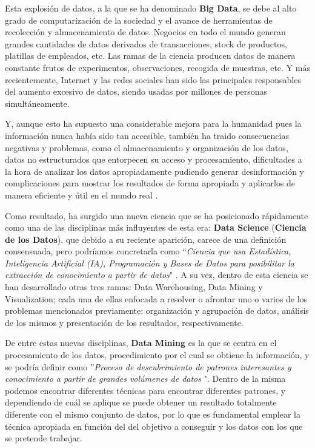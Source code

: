\documentclass[3p,twocolumn]{elsarticle}
\begin{document}
Esta explosión de datos, a la que se ha denominado \textbf{Big Data}, se debe al alto grado de computarización de la sociedad y el avance de herramientas de recolección y almacenamiento de datos. Negocios en todo el mundo generan grandes cantidades de datos derivados de transacciones, stock de productos,  platillas de empleados, etc. Las ramas de la ciencia producen datos de manera constante frutos de experimentos, observaciones, recogida de muestras, etc. Y más recientemente, Internet y las redes sociales han sido las principales responsables del aumento excesivo de datos, siendo usadas por millones de personas simultáneamente.

Y, aunque esto ha supuesto una considerable mejora para la humanidad pues la información nunca había sido tan accesible, también ha traido consecuencias negativas y problemas, como el almacenamiento y organización de los datos, datos no estructurados que entorpecen su acceso y procesamiento, dificultades a la hora de analizar los datos apropiadamente pudiendo generar desinformación y complicaciones para mostrar los resultados de forma apropiada y aplicarlos de manera eficiente y útil en el mundo real \cite{cita3}.

Como resultado, ha surgido una nueva ciencia que se ha posicionado rápidamente como una de las disciplinas más influyentes de esta era: \textbf{Data Science} (\textbf{Ciencia de los Datos}), que debido a su reciente aparición, carece de una definición consensuada, pero podríamos concretarla como ``\textit{Ciencia que usa Estadística, Inteligencia Artificial (IA), Programación y Bases de Datos para posibilitar la extracción de conocimiento a partir de datos}" \cite{cita4}. A su vez, dentro de esta ciencia se han desarrollado otras tres ramas: Data Warehousing, Data Mining y Visualization; cada una de ellas enfocada a resolver o afrontar uno o varios de los problemas mencionados previamente: organización y agrupación de datos, análisis de los mismos y presentación de los resultados, respectivamente.

De entre estas nuevas disciplinas, \textbf{Data Mining} es la que se centra en el procesamiento de los datos, procedimiento por el cual se obtiene la información, y se podría definir como ''\textit{Proceso de descubrimiento de patrones interesantes y conocimiento a partir de grandes volúmenes de datos} \cite{cita5}". Dentro de la misma podemos encontrar diferentes técnicas para encontrar diferentes patrones, y dependiendo de cuál se aplique se puede obtener un resultado totalmente diferente con el mismo conjunto de datos, por lo que es fundamental emplear la técnica apropiada en función del del objetivo a conseguir y los datos con los que se pretende trabajar.
\end{document}
